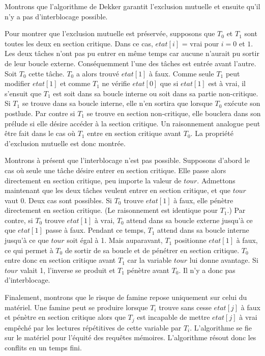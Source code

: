 Montrons que l'algorithme de Dekker garantit l'exclusion mutuelle et ensuite qu'il n'y a pas d'interblocage possible.
\par
Pour montrer que l'exclusion mutuelle est préservée, supposons que $T_0$ et $T_1$ sont toutes les deux en section critique. Dans ce cas, $etat[i]$ = vrai pour $i=0$ et $1$.  Les deux tâches n'ont pas pu entrer en même temps car aucune n'aurait pu sortir de leur boucle externe.  Conséquemment l'une des tâches est entrée avant l'autre.  Soit $T_0$ cette tâche.
$T_0$ a alors trouvé $etat[1]$ à faux.  Comme seule $T_1$ peut modifier $etat[1]$ et comme $T_1$ ne vérifie $etat[0]$ que si $etat[1]$ est à vrai, il s'ensuit que $T_1$ est soit dans sa boucle interne ou soit dans sa partie non-critique.  Si $T_1$ se trouve dans sa boucle interne, elle n'en sortira que lorsque $T_0$ exécute son postlude.
Par contre si $T_1$ se trouve en section non-critique, elle bouclera dans son prélude si elle désire accéder à la section critique.  Un raisonnement analogue peut être fait dans le cas où $T_1$ entre en section critique avant $T_0$.
La propriété d'exclusion mutuelle est donc montrée.
\par
Montrons à présent que l'interblocage n'est pas possible.
Supposons d'abord le cas où seule une tâche désire entrer en section critique. Elle passe alors directement en section critique, peu importe la valeur de $tour$.  Admettons maintenant que les deux tâches veulent entrer en section critique, et que $tour$ vaut 0. Deux cas sont possibles. Si $T_0$ trouve $etat[1]$ à faux,
elle pénètre directement en section critique.
(Le raisonnement est identique pour $T_1$.)
Par contre, si $T_0$ trouve $etat[1]$ à vrai, $T_0$ attend dans sa boucle externe jusqu'à ce que $etat[1]$ passe à faux. Pendant ce temps, $T_1$ attend dans sa boucle interne jusqu'à ce que $tour$ soit égal à 1.  Mais auparavant, $T_1$ positionne $etat[1]$ à faux, ce qui permet à $T_0$ de sortir de sa boucle et de pénétrer en section critique. $T_0$ entre donc en section critique avant $T_1$ car la variable $tour$ lui donne avantage.  Si $tour$ valait 1, l'inverse se produit et $T_1$ pénètre avant $T_0$.  Il n'y a donc pas d'interblocage.
\par
Finalement, montrons que le risque de famine repose uniquement sur celui du matériel.  Une famine peut se produire lorsque $T_i$ trouve sans cesse $etat[j]$ à faux et pénètre en section critique alors que $T_j$ est incapable de mettre $etat[j]$ à vrai empêché par les lectures répétitives de cette variable par $T_i$.
L'algorithme se fie sur le matériel pour l'équité des requêtes mémoires.  L'algorithme résout donc les conflits en un temps fini.

